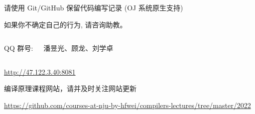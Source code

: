 \begin{frame}
  \begin{center}
    请使用 Git/GitHub 保留代码编写记录 (OJ 系统原生支持)

    \vspace{0.50cm}
    如果你不确定自己的行为, 请咨询助教。
  \end{center}
\end{frame}

\begin{frame}{}
  \begin{columns}
    \begin{center}
      QQ 群号: 

    \end{center}
    \begin{center}
      {\bf {}} 潘昱光、顾龙、刘学卓
    \end{center}
  \end{columns}
\end{frame}

\begin{frame}{}
  \begin{center}
    \url{http://47.122.3.40:8081} \\[5pt]


    编译原理课程网站，请并及时关注网站更新
  \end{center}
\end{frame}

\begin{frame}{}
  \begin{center}

    \vspace{0.50cm}
    \url{https://github.com/courses-at-nju-by-hfwei/compilers-lectures/tree/master/2022}
  \end{center}
\end{frame}

\begin{frame}{}
  \begin{center}
  \end{center}
\end{frame}

